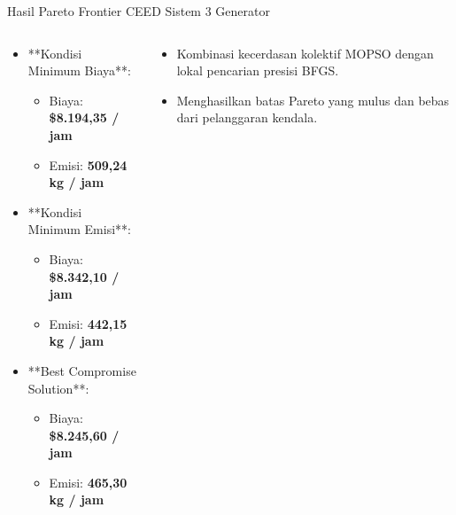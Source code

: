 \documentclass[10pt,aspectratio=169]{beamer}
\begin{document}
\begin{frame}{Hasil Pareto Frontier CEED Sistem 3 Generator}
    \begin{columns}
        \begin{tcolorbox}[colback=white,colframe=unibblue,title=\textbf{Analisis Trade-Off Solusi}]
            \begin{itemize}
                \item **Kondisi Minimum Biaya**:
                  \begin{itemize}
                      \item Biaya: \textbf{\$8.194,35 / jam}
                      \item Emisi: \textbf{509,24 kg / jam}
                  \end{itemize}
                \item **Kondisi Minimum Emisi**:
                  \begin{itemize}
                      \item Biaya: \textbf{\$8.342,10 / jam}
                      \item Emisi: \textbf{442,15 kg / jam}
                  \end{itemize}
                \item **Best Compromise Solution**:
                  \begin{itemize}
                      \item Biaya: \textbf{\$8.245,60 / jam}
                      \item Emisi: \textbf{465,30 kg / jam}
                  \end{itemize}
            \end{itemize}
        \end{tcolorbox}

        \begin{tcolorbox}[colback=white,colframe=darkgreen,title=\textbf{Manfaat Sintesis EE + Mesin}]
            \begin{itemize}
                \item Kombinasi kecerdasan kolektif MOPSO dengan lokal pencarian presisi BFGS.
                \item Menghasilkan batas Pareto yang mulus dan bebas dari pelanggaran kendala.
            \end{itemize}
        \end{tcolorbox}
    \end{columns}
\end{frame}
\end{document}
